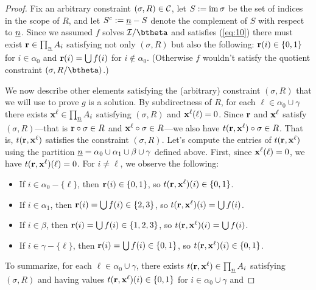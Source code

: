 \begin{example}
\begin{proof}
  Fix an arbitrary constraint $(\sigma, R)\in \mathcal{C}$, let $S := \operatorname{im} \sigma$ be the set
  of indices in the scope of $R$, and let $S^c := \underline{n} - S$ denote the complement
  of $S$ with respect to $\underline{n}$. Since we assumed $f$ solves $\sI/\btheta$ and satisfies (\ref{eq:10})  
    there must exist $\mathbf{r}\in \prod_{\underline{n}}A_i$ satisfying not only
  $(\sigma, R)$ but also the following: $\mathbf{r}(i) \in \{0,1\}$ for $i \in \alpha_0$ and 
  $\mathbf{r}(i) = \bigcup f(i)$ for $i \notin \alpha_0$. (Otherwise $f$
  wouldn't satisfy the quotient constraint $(\sigma, R/\btheta)$.)

  We now describe other elements satisfying the (arbitrary) constraint $(\sigma, R)$
  that we will use to prove $g$ is a solution.
  By subdirectness of $R$, for each $\ell \in \alpha_0 \cup \gamma$
  there exists $\mathbf{x}^\ell \in \prod_{\underline{n}}A_i$ satisfying $(\sigma, R)$ and $\mathbf{x}^\ell(\ell) = 0$.
  Since $\mathbf{r}$ and $\mathbf{x}^\ell$ satisfy $(\sigma, R)$---that
  is $\mathbf{r} \circ \sigma\in R$ and $\mathbf{x}^\ell \circ \sigma\in R$---we also have
  $t(\mathbf{r},  \mathbf{x}^\ell) \circ \sigma\in R$.
  That is, $t(\mathbf{r}, \mathbf{x}^\ell)$ satisfies the constraint $(\sigma, R)$.
  Let's compute the entries of
  $t(\mathbf{r}, \mathbf{x}^\ell)$  using the partition $\underline{n} = \alpha_0 \cup \alpha_1 \cup \beta \cup \gamma$ defined above.
  First, since $\mathbf{x}^\ell(\ell) = 0$, we have $t(\mathbf{r}, \mathbf{x}^\ell)(\ell)=0$.  For $i \neq \ell$, we observe the following:
  \begin{itemize}
  \item
    If $i\in \alpha_0 - \{\ell\}$, then $\mathbf{r}(i) \in \{0,1\}$, %
    so $t(\mathbf{r}, \mathbf{x}^\ell)(i)\in\{0,1\}$.
  \item
    If $i\in \alpha_1$, then $\mathbf{r}(i) = \bigcup f(i)\in \{2,3\}$, %
    so $t(\mathbf{r}, \mathbf{x}^\ell)(i)=\bigcup f(i)$.
  \item
    If $i\in \beta$, then $\mathbf{r}(i)= \bigcup f(i)\in \{1,2,3\}$, %
    so $t(\mathbf{r}, \mathbf{x}^\ell)(i) = \bigcup f(i)$.
  \item
    If $i\in \gamma-\{\ell\}$, then $\mathbf{r}(i)= \bigcup f(i)\in \{0,1\}$,  %
    so $t(\mathbf{r}, \mathbf{x}^\ell)(i) \in \{0,1\}$.
  \end{itemize}
  To summarize, for each $\ell \in \alpha_0 \cup \gamma$,
  there exists $t(\mathbf{r}, \mathbf{x}^\ell) \in \prod_{\underline{n}}A_i$
  satisfying $(\sigma, R)$ and having values
  $t(\mathbf{r}, \mathbf{x}^\ell)(i) \in \{0,1\}$ for $i \in \alpha_0\cup \gamma$ and

\end{proof}
\end{example}
